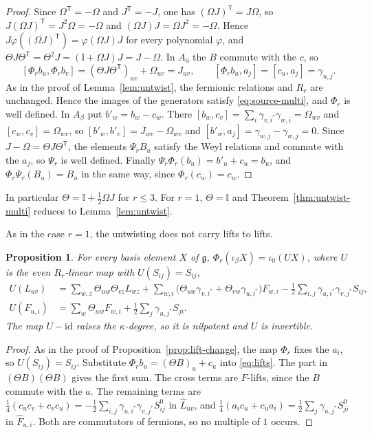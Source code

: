 \documentclass[11pt]{article}
\numberwithin{equation}{section}
\newtheorem{proposition}[theorem]{Proposition}
\theoremstyle{definition}
\theoremstyle{remark}
\begin{document}
\begin{proof}
Since $\Omega^{\mathsf T}=-\Omega$ and $J^{\mathsf T}=-J$, one has
$(\Omega J)^{\mathsf T}=J\Omega$, so $J(\Omega J)^{\mathsf T}=J^2\Omega=-\Omega$ and $(\Omega J)J=\Omega J^2=-\Omega$. Hence
$J\varphi((\Omega J)^{\mathsf T})=\varphi(\Omega J)J$ for every polynomial $\varphi$, and
$\Theta J\Theta^{\mathsf T}=\Theta^2J=(\mathbb I+\Omega J)J=J-\Omega$. In $A_0$ the $B$ commute with the $c$, so
\[
 [\Phi_rb_u,\Phi_rb_v]=(\Theta J\Theta^{\mathsf T})_{uv}+\Omega_{uv}=J_{uv},\qquad
 [\Phi_rb_u,a_j]=[c_u,a_j]=\gamma_{u,j}.
\]
As in the proof of Lemma~\ref{lem:untwist}, the fermionic relations and $R_r$ are unchanged.
Hence the images of the generators satisfy \eqref{eq:source-multi}, and $\Phi_r$ is well defined. In $A_\beta$ put $b'_w=b_w-c_w$. There
$[b_w,c_v]=\sum_i\gamma_{v,i^*}\gamma_{w,i}=\Omega_{wv}$ and $[c_w,c_v]=\Omega_{wv}$, so
$[b'_w,b'_v]=J_{wv}-\Omega_{wv}$ and $[b'_w,a_j]=\gamma_{w,j}-\gamma_{w,j}=0$. Since
$J-\Omega=\Theta J\Theta^{\mathsf T}$, the elements $\Psi_rB_u$ satisfy the Weyl relations and commute
with the $a_j$, so $\Psi_r$ is well defined. Finally $\Psi_r\Phi_r(b_u)=b'_u+c_u=b_u$,
and $\Phi_r\Psi_r(B_u)=B_u$ in the same way, since $\Phi_r(c_w)=c_w$.
\end{proof}

In particular $\Theta=\mathbb I+\tfrac12\Omega J$ for $r\leq3$. For $r=1$, $\Theta=\mathbb I$ and
Theorem~\ref{thm:untwist-multi} reduces to Lemma~\ref{lem:untwist}.

As in the case $r=1$, the untwisting does not carry lifts to lifts.

\begin{proposition}\label{prop:lift-change-multi}
For every basis element $X$ of $\mathfrak g$, $\Phi_r(\iota_\beta X)=\iota_0(UX)$, where $U$ is the even
$R_r$-linear map with $U(S_{ij})=S_{ij}$,
\begin{align*}
 U(L_{uv})&=\sum_{w,z}\Theta_{uw}\Theta_{vz}L_{wz}
  +\sum_{w,i}\bigl(\Theta_{uw}\gamma_{v,i^*}+\Theta_{vw}\gamma_{u,i^*}\bigr)F_{w,i}
  -\tfrac12\sum_{i,j}\gamma_{u,i^*}\gamma_{v,j^*}S_{ij},\\
 U(F_{u,i})&=\sum_w\Theta_{uw}F_{w,i}+\tfrac12\sum_j\gamma_{u,j^*}S_{ji}.
\end{align*}
The map $U-\mathrm{id}$ raises the $\kappa$-degree, so it is nilpotent and $U$ is invertible.
\end{proposition}

\begin{proof}
As in the proof of Proposition~\ref{prop:lift-change}, the map $\Phi_r$ fixes the $a_i$, so
$U(S_{ij})=S_{ij}$. Substitute $\Phi_rb_u=(\Theta B)_u+c_u$ into \eqref{eq:lifts}. The part in $(\Theta B)(\Theta B)$ gives
the first sum. The cross terms are $F$-lifts, since the $B$ commute with the $a$. The
remaining terms are $\tfrac14(c_uc_v+c_vc_u)=-\tfrac12\sum_{i,j}\gamma_{u,i^*}\gamma_{v,j^*}S^0_{ij}$
in $\widehat L_{uv}$, and $\tfrac14(a_ic_u+c_ua_i)=\tfrac12\sum_j\gamma_{u,j^*}S^0_{ji}$
in $\widehat F_{u,i}$. Both are commutators of fermions, so no multiple of $1$ occurs.
\end{proof}
\end{document}
